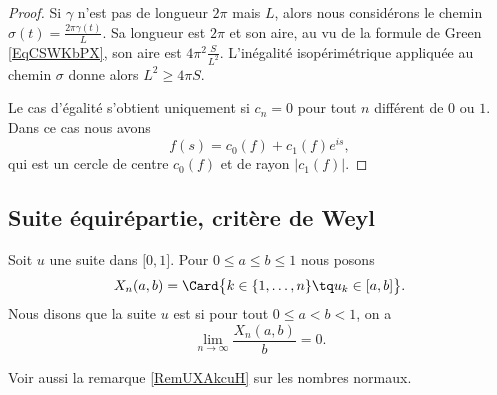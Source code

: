 \begin{proof}
    Si \( \gamma\) n'est pas de longueur \( 2\pi\) mais \( L\), alors nous considérons le chemin \( \sigma(t)=\frac{ 2\pi\gamma(t) }{ L }\). Sa longueur est \( 2\pi\) et son aire, au vu de la formule de Green \eqref{EqCSWKbPX}, son aire est \( 4\pi^2\frac{ S }{ L^2 }\). L'inégalité isopérimétrique appliquée au chemin \( \sigma\) donne alors \( L^2\geq 4\pi S\).

    Le cas d'égalité s'obtient uniquement si \( c_n=0\) pour tout \( n\) différent de \( 0\) ou \( 1\). Dans ce cas nous avons 
    \begin{equation}
        f(s)=c_0(f)+c_1(f) e^{is},
    \end{equation}
    qui est un cercle de centre \( c_0(f)\) et de rayon \( | c_1(f) |\).
\end{proof}

\subsection{Suite équirépartie, critère de Weyl}

\begin{definition}
    Soit \( u\) une suite dans \( \mathopen[ 0 , 1 \mathclose]\). Pour \( 0\leq a\leq b\leq 1\) nous posons
    \begin{equation}
        X_n(a,b)=\Card\big\{  k\in\{ 1,\ldots, n \}\tq u_k\in\mathopen[ a , b \mathclose] \big\}.
    \end{equation}
    Nous disons que la suite \( u\) est  si pour tout \( 0\leq a<b<1\), on a
    \begin{equation}
        \lim_{n\to \infty} \frac{ X_n(a,b) }{ b }=0.
    \end{equation}
\end{definition}
Voir aussi la remarque \ref{RemUXAkcuH} sur les nombres normaux.


